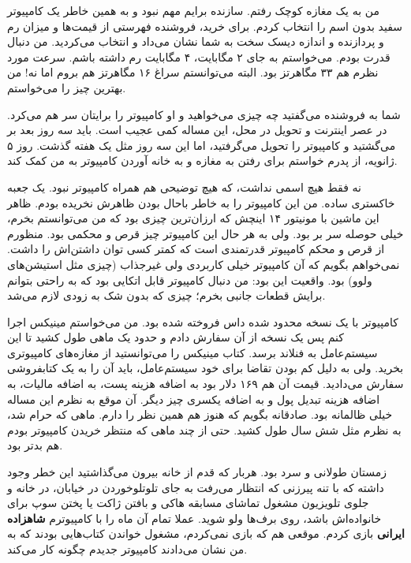 من به یک مغازه کوچک رفتم. سازنده برایم مهم نبود و به همین خاطر یک
کامپیوتر سفید بدون اسم را انتخاب کردم. برای خرید،‌ فروشنده فهرستی از
قیمت‌ها و میزان رم و پردازنده و اندازه دیسک سخت به شما نشان می‌داد و
انتخاب می‌کردید. من دنبال قدرت بودم. می‌خواستم به جای ۲ مگابایت، ۴
مگابایت رم داشته باشم. سرعت مورد نظرم هم ۳۳ مگاهرتز بود. البته
می‌توانستم سراغ ۱۶ مگاهرتز هم بروم اما نه! من بهترین چیز را می‌خواستم.

شما به فروشنده می‌گفتید چه چیزی می‌خواهید و او کامپیوتر را برایتان سر هم
می‌کرد. در عصر اینترنت و تحویل در محل، این مساله کمی عجیب است. باید سه
روز بعد بر می‌گشتید و کامپیوتر را تحویل می‌گرفتید، اما این سه روز مثل یک
هفته گذشت. روز ۵ ژانویه، از پدرم خواستم برای رفتن به مغازه و به خانه
آوردن کامپیوتر به من کمک کند.

نه فقط هیچ اسمی نداشت، که هیچ توضیحی هم همراه کامپیوتر نبود. یک جعبه
خاکستری ساده. من این کامپیوتر را به خاطر باحال بودن‌ ظاهرش نخریده
بودم. ظاهر این ماشین با مونیتور ۱۴ اینچش که ارزان‌ترین چیزی بود که من
می‌توانستم بخرم، خیلی حوصله‌ سر بر بود. ولی به هر حال این کامپیوتر چیز
قرص و محکمی بود. منظورم از قرص و محکم کامپیوتر قدرتمندی است که کمتر
کسی توان داشتن‌اش را داشت. نمی‌خواهم بگویم که آن کامپیوتر خیلی کاربردی
ولی غیرجذاب (چیزی مثل استیشن‌های ولوو) بود. واقعیت این بود: من دنبال
کامپیوتر قابل اتکایی بود که به راحتی بتوانم برایش قطعات جانبی بخرم؛
چیزی که بدون شک به زودی لازم می‌شد.

کامپیوتر با یک نسخه محدود شده داس فروخته شده بود. من می‌خواستم مینیکس
اجرا کنم پس یک نسخه‌ از آن سفارش دادم و حدود یک ماهی طول کشید تا این
سیستم‌عامل به فنلاند برسد. کتاب مینیکس را می‌توانستید از مغازه‌های
کامپیوتری بخرید. ولی به دلیل کم بودن تقاضا برای خود سیستم‌عامل، باید آن
را به یک کتابفروشی سفارش می‌دادید. قیمت آن هم ۱۶۹ دلار بود به اضافه
هزینه پست، به اضافه مالیات، به اضافه هزینه تبدیل پول و به اضافه یکسری
چیز دیگر. آن موقع به نظرم این مساله خیلی ظالمانه بود. صادقانه بگویم که
هنوز هم همین نظر را دارم. ماهی که حرام شد،‌ به نظرم مثل شش سال طول
کشید. حتی از چند ماهی که منتظر خریدن کامپیوتر بودم هم بدتر بود.

زمستان طولانی و سرد بود. هربار که قدم از خانه بیرون می‌گذاشتید این خطر
وجود داشته که با تنه پیرزنی که انتظار می‌رفت به جای تلوتلوخوردن در
خیابان، در خانه و جلوی تلویزیون مشغول تماشای مسابقه هاکی و بافتن ژاکت
یا پختن سوپ برای خانواده‌اش باشد، روی برف‌ها ولو شوید. عملا تمام آن ماه
را با کامپیوترم \textbf{شاهزاده ایرانی} بازی کردم. موقعی هم که بازی نمی‌کردم، مشغول خواندن کتاب‌هایی
بودند که به من نشان می‌دادند کامپیوتر جدیدم چگونه کار می‌کند.

